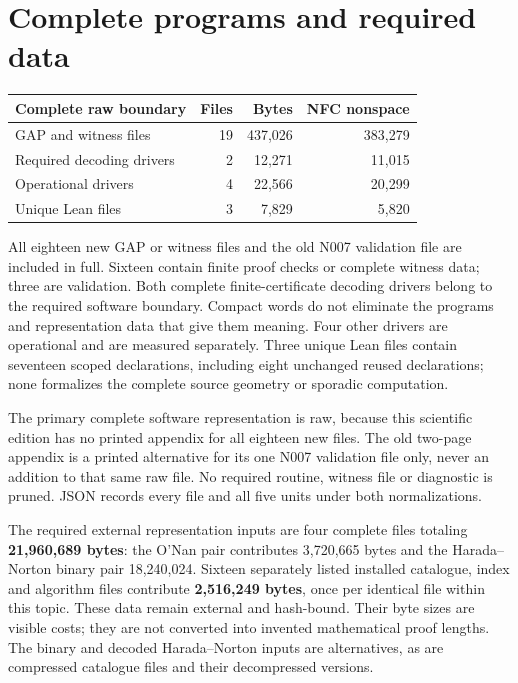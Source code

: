 \documentclass[11pt,a4paper]{article}
\begin{document}
\section*{Complete programs and required data}
\begin{center}\begin{tabular}{lrrr}\toprule
Complete raw boundary & Files & Bytes & NFC nonspace\\\midrule
GAP and witness files & 19 & 437,026 & 383,279\\
Required decoding drivers & 2 & 12,271 & 11,015\\
Operational drivers & 4 & 22,566 & 20,299\\
Unique Lean files & 3 & 7,829 & 5,820\\
\bottomrule\end{tabular}\end{center}
All eighteen new GAP or witness files and the old N007 validation file are included in full. Sixteen contain finite proof checks or complete witness data; three are validation. Both complete finite-certificate decoding drivers belong to the required software boundary. Compact words do not eliminate the programs and representation data that give them meaning. Four other drivers are operational and are measured separately. Three unique Lean files contain seventeen scoped declarations, including eight unchanged reused declarations; none formalizes the complete source geometry or sporadic computation.

The primary complete software representation is raw, because this scientific edition has no printed appendix for all eighteen new files. The old two-page appendix is a printed alternative for its one N007 validation file only, never an addition to that same raw file. No required routine, witness file or diagnostic is pruned. JSON records every file and all five units under both normalizations.

The required external representation inputs are four complete files totaling \textbf{21,960,689 bytes}: the O'Nan pair contributes 3,720,665 bytes and the Harada--Norton binary pair 18,240,024. Sixteen separately listed installed catalogue, index and algorithm files contribute \textbf{2,516,249 bytes}, once per identical file within this topic. These data remain external and hash-bound. Their byte sizes are visible costs; they are not converted into invented mathematical proof lengths. The binary and decoded Harada--Norton inputs are alternatives, as are compressed catalogue files and their decompressed versions.
\end{document}
